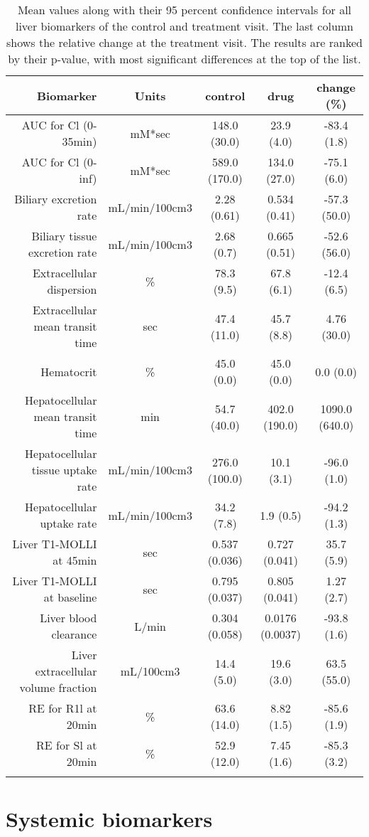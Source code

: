 \documentclass{epflreport}%
\begin{document}
\begin{longtable}{rcccc}%
\hline%
Biomarker&Units&control&drug&change (\%)\\%
\hline%
AUC for Cl (0{-}35min)&mM*sec&148.0 (30.0) &23.9 (4.0) &{-}83.4 (1.8) \\%
AUC for Cl (0{-}inf)&mM*sec&589.0 (170.0) &134.0 (27.0) &{-}75.1 (6.0) \\%
Biliary excretion rate&mL/min/100cm3&2.28 (0.61) &0.534 (0.41) &{-}57.3 (50.0) \\%
Biliary tissue excretion rate&mL/min/100cm3&2.68 (0.7) &0.665 (0.51) &{-}52.6 (56.0) \\%
Extracellular dispersion&\%&78.3 (9.5) &67.8 (6.1) &{-}12.4 (6.5) \\%
Extracellular mean transit time&sec&47.4 (11.0) &45.7 (8.8) &4.76 (30.0) \\%
Hematocrit&\%&45.0 (0.0) &45.0 (0.0) &0.0 (0.0) \\%
Hepatocellular mean transit time&min&54.7 (40.0) &402.0 (190.0) &1090.0 (640.0) \\%
Hepatocellular tissue uptake rate&mL/min/100cm3&276.0 (100.0) &10.1 (3.1) &{-}96.0 (1.0) \\%
Hepatocellular uptake rate&mL/min/100cm3&34.2 (7.8) &1.9 (0.5) &{-}94.2 (1.3) \\%
Liver T1{-}MOLLI at 45min&sec&0.537 (0.036) &0.727 (0.041) &35.7 (5.9) \\%
Liver T1{-}MOLLI at baseline&sec&0.795 (0.037) &0.805 (0.041) &1.27 (2.7) \\%
Liver blood clearance&L/min&0.304 (0.058) &0.0176 (0.0037) &{-}93.8 (1.6) \\%
Liver extracellular volume fraction&mL/100cm3&14.4 (5.0) &19.6 (3.0) &63.5 (55.0) \\%
RE for R1l at 20min&\%&63.6 (14.0) &8.82 (1.5) &{-}85.6 (1.9) \\%
RE for Sl at 20min&\%&52.9 (12.0) &7.45 (1.6) &{-}85.3 (3.2) \\%
\hline%
\caption{Mean values along with their 95 percent confidence intervals for all liver biomarkers of the control and treatment visit. The last column shows the relative change at the treatment visit. The results are ranked by their p-value, with most significant differences at the top of the list.} \\%
\end{longtable}%
\clearpage%
\section{Systemic biomarkers}%
\label{sec:Systemicbiomarkers}%
\end{document}
